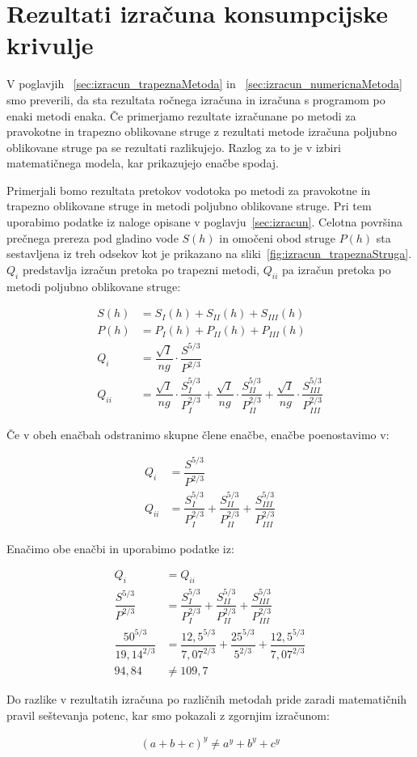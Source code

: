 \section{Rezultati izračuna konsumpcijske krivulje} \label{sec:opis_rezultatIzracuna}
V poglavjih ~\ref{sec:izracun_trapeznaMetoda} in ~\ref{sec:izracun_numericnaMetoda} smo preverili, da sta rezultata ročnega izračuna in izračuna s programom po enaki metodi enaka. Če primerjamo rezultate izračunane po metodi za pravokotne in trapezno oblikovane struge z rezultati metode izračuna poljubno oblikovane struge pa se rezultati razlikujejo. Razlog za to je v izbiri matematičnega modela, kar prikazujejo enačbe spodaj.

Primerjali bomo rezultata pretokov vodotoka po metodi za pravokotne in trapezno oblikovane struge in metodi poljubno oblikovane struge. Pri tem uporabimo podatke iz naloge opisane v poglavju~\ref{sec:izracun}. Celotna površina prečnega prereza pod gladino vode $S(h)$ in omočeni obod struge $P(h)$ sta sestavljena iz treh odsekov kot je prikazano na sliki~\ref{fig:izracun_trapeznaStruga}. $Q_i$ predstavlja izračun pretoka po trapezni metodi, $Q_{ii}$ pa izračun pretoka po metodi poljubno oblikovane struge:
\begin{ceqn}
	\begin{align}
	S(h)&= S_I(h) + S_{II}(h) + S_{III}(h)\\
	P(h)&= P_I(h) + P_{II}(h) + P_{III}(h)\\
	Q_i &= \dfrac{\sqrt{I}}{ng} \cdot \dfrac{S^{5/3}}{P^{2/3}} \\
	Q_{ii} &= \dfrac{\sqrt{I}}{ng} \cdot \dfrac{S_I^{5/3}}{P_I^{2/3}} + \dfrac{\sqrt{I}}{ng} \cdot \dfrac{S_{II}^{5/3}}{P_{II}^{2/3}} + \dfrac{\sqrt{I}}{ng} \cdot \dfrac{S_{III}^{5/3}}{P_{III}^{2/3}}
	\end{align}
\end{ceqn}

Če v obeh enačbah odstranimo skupne člene enačbe, enačbe poenostavimo v:

\begin{ceqn}
	\begin{align}
	Q_i &=\dfrac{S^{5/3}}{P^{2/3}}\\
	Q_{ii} &= \dfrac{S_I^{5/3}}{P_I^{2/3}} + \dfrac{S_{II}^{5/3}}{P_{II}^{2/3}} + \dfrac{S_{III}^{5/3}}{P_{III}^{2/3}}
	\end{align}
\end{ceqn}


Enačimo obe enačbi in uporabimo podatke iz:
\begin{ceqn}
	\begin{align}
	Q_i &= Q_{ii}\\
	\dfrac{S^{5/3}}{P^{2/3}} &= \dfrac{S_I^{5/3}}{P_I^{2/3}} + \dfrac{S_{II}^{5/3}}{P_{II}^{2/3}} + \dfrac{S_{III}^{5/3}}{P_{III}^{2/3}}\\
	\dfrac{50^{5/3}}{19,14^{2/3}} &= \dfrac{12,5^{5/3}}{7,07^{2/3}} + \dfrac{25^{5/3}}{5^{2/3}} + \dfrac{12,5^{5/3}}{7,07^{2/3}}\\
	94,84 &\neq 109,7
	\end{align}
\end{ceqn}


Do razlike v rezultatih izračuna po različnih metodah pride zaradi matematičnih pravil seštevanja potenc, kar smo pokazali z zgornjim izračunom:
\begin{ceqn}
	\begin{align}
	(a+b+c)^y \neq a^y + b^y + c^y
	\end{align}
\end{ceqn}

